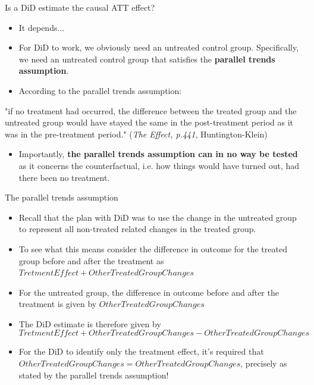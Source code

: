 \documentclass[notes,11pt, aspectratio=169]{beamer}
\begin{document}
\begin{frame}{Is a DiD estimate the causal ATT effect?}
\begin{itemize}
    \item It depends... 

    \item For DiD to work, we obviously need an untreated control group. Specifically, we need an untreated control group that satisfies the \textbf{parallel trends assumption}.

    \item According to the parallel trends assumption:
\end{itemize}
  \begin{displayquote}
"if no treatment had occurred, the difference between the treated group and the untreated group would have stayed the same in the post-treatment period as it was in the pre-treatment period."
\flushright\tiny (\emph{The Effect, p.441}, Huntington-Klein)
\end{displayquote}
\begin{itemize}
    \item Importantly, \textbf{the parallel trends assumption can in no way be tested} as it concerns the counterfactual, i.e. how things would have turned out, had there been no treatment.
\end{itemize}
\end{frame}

\begin{frame}{The parallel trends assumption}
\begin{itemize}
    \item Recall that the plan with DiD was to use the change in the untreated group to represent all non-treated related changes in the treated group. 
    \item To see what this means consider the difference in outcome for the treated group before and after the treatment as $TretmentEffect + OtherTreatedGroupChanges$    
    \item For the untreated group, the difference in outcome before and after the treatment is given by $OtherTreatedGroupChanges$
    \item The DiD estimate is therefore given by
\begin{equation}
TretmentEffect + OtherTreatedGroupChanges - OtherTreatedGroupChanges
\end{equation}
    \item For the DiD to identify only the treatment effect, it's required that $OtherTreatedGroupChanges = OtherTreatedGroupChanges$, precisely as stated by the parallel trends assumption!
\end{itemize}
\end{frame}
\end{document}
